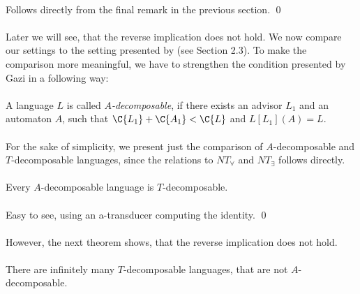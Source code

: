 \paragraph{}
\dokaz Follows directly from the final remark in the previous section. \qed

\paragraph{}
Later we will see, that the reverse implication does not hold. We now compare our settings to the setting presented by \cite{Gazi} (see Section 2.3). To make the comparison more meaningful, we have to strengthen the condition presented by Gazi in a following way:

\paragraph{}
\cdefinicia A language $L$ is called \emph{$A$-decomposable}, if there exists an advisor $L_1$ and an automaton $A$, such that $\C{L_1} + \C{A_1} < \C{L}$ and $L[L_1](A) = L$.

\paragraph{}
For the sake of simplicity, we present just the comparison of $A$-decomposable and $T$-decomposable languages, since the relations to $NT_{\forall}$  and $NT_{\exists}$ follows directly.

\paragraph{}
\cveta Every $A$-decomposable language is $T$-decomposable.

\paragraph{}
\dokaz Easy to see, using an a-transducer computing the identity. \qed

\paragraph{}
However, the next theorem shows, that the reverse implication does not hold.

\paragraph{}
\cveta There are infinitely many $T$-decomposable languages, that are not $A$-decomposable.

